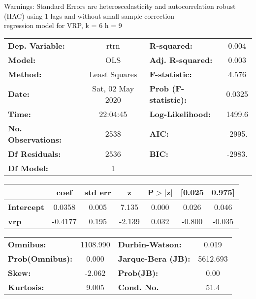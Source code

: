 Warnings: \newline
 [1] Standard Errors are heteroscedasticity and autocorrelation robust (HAC) using 1 lags and without small sample correction\\ 

regression model for VRP, k = 6 h = 9\begin{center}
\begin{tabular}{lclc}
\toprule
\textbf{Dep. Variable:}    &       rtrn       & \textbf{  R-squared:         } &     0.004   \\
\textbf{Model:}            &       OLS        & \textbf{  Adj. R-squared:    } &     0.003   \\
\textbf{Method:}           &  Least Squares   & \textbf{  F-statistic:       } &     4.576   \\
\textbf{Date:}             & Sat, 02 May 2020 & \textbf{  Prob (F-statistic):} &   0.0325    \\
\textbf{Time:}             &     22:04:45     & \textbf{  Log-Likelihood:    } &    1499.6   \\
\textbf{No. Observations:} &        2538      & \textbf{  AIC:               } &    -2995.   \\
\textbf{Df Residuals:}     &        2536      & \textbf{  BIC:               } &    -2983.   \\
\textbf{Df Model:}         &           1      & \textbf{                     } &             \\
\bottomrule
\end{tabular}
\begin{tabular}{lcccccc}
                   & \textbf{coef} & \textbf{std err} & \textbf{z} & \textbf{P$> |$z$|$} & \textbf{[0.025} & \textbf{0.975]}  \\
\midrule
\textbf{Intercept} &       0.0358  &        0.005     &     7.135  &         0.000        &        0.026    &        0.046     \\
\textbf{vrp}       &      -0.4177  &        0.195     &    -2.139  &         0.032        &       -0.800    &       -0.035     \\
\bottomrule
\end{tabular}
\begin{tabular}{lclc}
\textbf{Omnibus:}       & 1108.990 & \textbf{  Durbin-Watson:     } &    0.019  \\
\textbf{Prob(Omnibus):} &   0.000  & \textbf{  Jarque-Bera (JB):  } & 5612.693  \\
\textbf{Skew:}          &  -2.062  & \textbf{  Prob(JB):          } &     0.00  \\
\textbf{Kurtosis:}      &   9.005  & \textbf{  Cond. No.          } &     51.4  \\
\bottomrule
\end{tabular}
\end{center}

